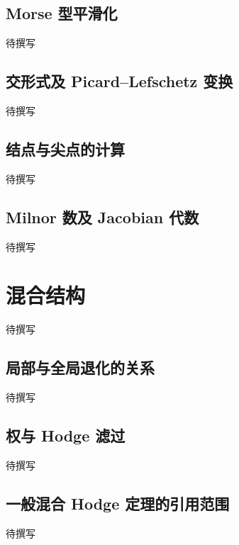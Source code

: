\subsection{Morse 型平滑化}
\label{g4:subsec:B02:01}
待撰写

\subsection{交形式及 Picard–Lefschetz 变换}
\label{g4:subsec:B02:02}
待撰写

\subsection{结点与尖点的计算}
\label{g4:subsec:B02:03}
待撰写

\subsection{Milnor 数及 Jacobian 代数}
\label{g4:subsec:B02:04}
待撰写

\section{混合结构}
\label{g4:sec:B03}
待撰写

\subsection{局部与全局退化的关系}
\label{g4:subsec:B03:01}
待撰写

\subsection{权与 Hodge 滤过}
\label{g4:subsec:B03:02}
待撰写

\subsection{一般混合 Hodge 定理的引用范围}
\label{g4:subsec:B03:03}
待撰写
